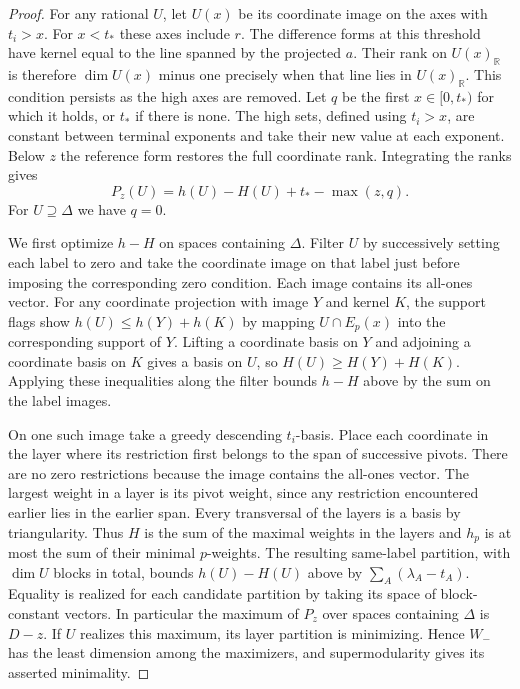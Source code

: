 \documentclass[11pt,reqno,a4paper]{amsart}
\theoremstyle{remark}
\numberwithin{equation}{section}
\begin{document}
\begin{proof}
For any rational $U$, let $U(x)$ be its coordinate image on the axes
with $t_i>x$. For $x<t_*$ these axes include $r$. The difference
forms at this threshold have kernel equal to the line spanned by
the projected $a$. Their rank on $U(x)_{\mathbb R}$ is therefore
$\dim U(x)$ minus one precisely when that line lies in
$U(x)_{\mathbb R}$. This condition persists as the high axes are
removed. Let $q$ be the first $x\in[0,t_*)$ for which it holds, or
$t_*$ if there is none. The high sets, defined using $t_i>x$, are
constant between terminal exponents and take their new value at
each exponent. Below $z$ the reference form restores the full
coordinate rank. Integrating the ranks gives
\begin{equation}\label{eq:core-rank}
 P_z(U)=h(U)-H(U)+t_*-\max(z,q).
\end{equation}
For $U\supseteq\Delta$ we have $q=0$.

We first optimize $h-H$ on spaces containing $\Delta$. Filter $U$
by successively setting each label to zero and take the coordinate
image on that label just before imposing the corresponding zero
condition. Each image contains its all-ones vector. For any
coordinate projection with image $Y$ and kernel $K$, the support
flags show $h(U)\le h(Y)+h(K)$ by mapping $U\cap E_p(x)$ into the
corresponding support of $Y$. Lifting a coordinate basis on $Y$ and
adjoining a coordinate basis on $K$ gives a basis on $U$, so
$H(U)\ge H(Y)+H(K)$. Applying these inequalities along the filter
bounds $h-H$ above by the sum on the label images.

On one such image take a greedy descending $t_i$-basis. Place each
coordinate in the layer where its restriction first belongs to the
span of successive pivots. There are no zero restrictions because
the image contains the all-ones vector. The largest weight in a
layer is its pivot weight, since any restriction encountered
earlier lies in the earlier span. Every transversal of the layers
is a basis by triangularity. Thus $H$ is the sum of the maximal
weights in the layers and $h_p$ is at most the sum of their minimal
$p$-weights. The resulting same-label partition, with $\dim U$
blocks in total, bounds $h(U)-H(U)$ above by
$\sum_A(\lambda_A-t_A)$. Equality is realized for each candidate
partition by taking its space of block-constant vectors. In
particular the maximum of $P_z$ over spaces containing $\Delta$
is $D-z$. If $U$ realizes this maximum, its layer partition is
minimizing. Hence $W_-$ has the least dimension among the
maximizers, and supermodularity gives its asserted minimality.


\end{proof}
\end{document}

